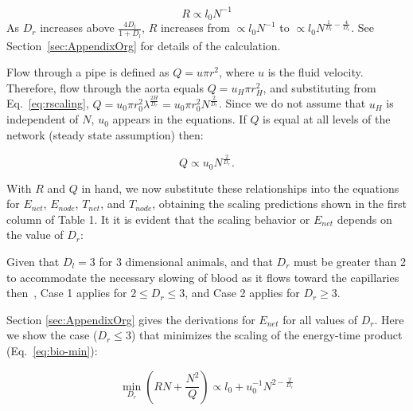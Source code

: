 \documentclass[12pt]{article}
\begin{document}
\begin{equation}
R \propto l_0 N^{-1} 
\end {equation}
As
$D_r$ increases above $\frac{4D_l}{1+D_l}$, $R$ increases from $\propto l_0 N^{-1}$ to $\propto
l_0 N^{\frac{1}{D_l} - \frac{4}{D_r}}$. 
See Section~\ref{sec:AppendixOrg} for details of the calculation.

Flow through a pipe is defined as $Q = u\pi r^2$, where $u$ is the fluid
velocity. 
Therefore, flow through the aorta equals $Q = u_H \pi r_{H}^2$, and
substituting from Eq.~\ref{eq:rscaling}, $Q = u_0 \pi r_0^2
\lambda^{\frac{2H}{D_r}} = u_0 \pi r_0^2N^{\frac{2}{D_r}} $.  Since we do not assume
that $u_H$ is independent of $N$, $u_0$ appears in the 
equations. If $Q$ is equal at all levels of the network (steady state
assumption) then:

\begin{equation}
Q \propto u_0 N^{\frac{2}{D_r}}.
\end{equation}


With $R$ and $Q$ in hand, we now substitute these relationships into
the equations for $E_{net}$, $E_{node}$, $T_{net}$, and $T_{node}$,
obtaining the scaling predictions shown in the first column of Table 1.
It it is evident that the scaling behavior or $E_{net}$ depends on the value of $D_r$:


\begin{caseof}

\end{caseof}



Given that $D_l = 3$ for 3 dimensional animals, and that $D_r$ must be greater than 2 to accommodate the necessary slowing of blood as it flows toward the capillaries then~\cite{west97}, Case 1 applies for $2 \leq D_r \le 3$, and Case 2 applies for $D_r \geq 3$.
 

Section \ref{sec:AppendixOrg} gives the derivations for $E_{net}$
for all values of $D_r$. Here we show the case ($D_r \leq 3$) that minimizes
the scaling of the energy-time product (Eq.~\ref{eq:bio-min}):

\begin{equation}
  \min_{D_r} (RN + \frac{N^2}{Q})
  \propto l_0 + u_0^{-1}N^{2-\frac{2}{D_r}}
\label{eq:bio-min2}
\end{equation}
\end{document}
